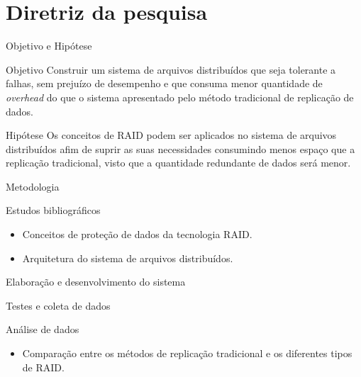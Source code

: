 \section{Diretriz da pesquisa}

\begin{frame}{Objetivo e Hipótese}
	
	\begin{block}{Objetivo}
		Construir um sistema de arquivos distribuídos que seja tolerante a falhas, sem prejuízo de desempenho e que consuma menor quantidade de \textit{overhead} do que o sistema apresentado pelo método tradicional de replicação de dados.
		
	\end{block}
	
	\begin{block}{Hipótese}
		Os conceitos de RAID podem ser aplicados no sistema de arquivos distribuídos afim de suprir as suas necessidades consumindo menos espaço que a replicação tradicional, visto que a quantidade redundante de dados será menor. 
		
	\end{block}
	
\end{frame}

\begin{frame}{Metodologia}
	
	\begin{block}{Estudos bibliográficos}
		\begin{itemize}
			\item Conceitos de proteção de dados da tecnologia RAID.
			\item Arquitetura do sistema de arquivos distribuídos.
		\end{itemize}
	\end{block}
	
	\begin{block}{Elaboração e desenvolvimento do sistema}
		
	\end{block}
	
	\begin{block}{Testes e coleta de dados}
		
	\end{block}
	
	\begin{block}{Análise de dados}
		\begin{itemize}
			\item Comparação entre os métodos de replicação tradicional e os diferentes tipos de RAID.
		\end{itemize}
		
	\end{block}
	
\end{frame}